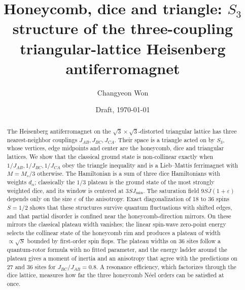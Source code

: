 \documentclass[prb,twocolumn,superscriptaddress,amsmath,amssymb,floatfix]{revtex4-2}
\begin{document}
\title{Honeycomb, dice and triangle: $S_3$ structure of the three-coupling\\ triangular-lattice Heisenberg antiferromagnet}

\author{Changyeon Won}

\date{Draft, \today}

\begin{abstract}
The Heisenberg antiferromagnet on the $\sqrt3\times\sqrt3$-distorted triangular lattice has three nearest-neighbor couplings $J_{AB},J_{BC},J_{CA}$. Their space is a triangle acted on by $S_3$, whose vertices, edge midpoints and center are the honeycomb, dice and triangular lattices. We show that the classical ground state is non-collinear exactly when $1/J_{AB},1/J_{BC},1/J_{CA}$ obey the triangle inequality and is a Lieb--Mattis ferrimagnet with $M=M_s/3$ otherwise. The Hamiltonian is a sum of three dice Hamiltonians with weights $d_\alpha$; classically the $1/3$ plateau is the ground state of the most strongly weighted dice, and its window is centered at $3SJ_{\min}$. The saturation field $9S\bar J(1+\varepsilon)$ depends only on the size $\varepsilon$ of the anisotropy. Exact diagonalization of 18 to 36 spins $S=1/2$ shows that these structures survive quantum fluctuations with shifted edges, and that partial disorder is confined near the honeycomb-direction mirrors. On these mirrors the classical plateau width vanishes; the linear spin-wave zero-point energy selects the collinear state of the honeycomb rim and produces a plateau of width $\propto\sqrt S$ bounded by first-order spin flops. The plateau widths on 36 sites follow a quantum-rotor formula with no fitted parameter, and the energy ladder around the plateau gives a moment of inertia and an anisotropy that agree with the predictions on 27 and 36 sites for $J_{BC}/J_{AB}=0.8$. A resonance efficiency, which factorizes through the dice lattice, measures how far the three honeycomb N\'eel orders can be satisfied at once.
\end{abstract}

\maketitle

\end{document}
